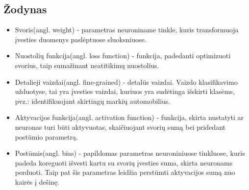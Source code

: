 \documentclass{VUMIFPSkursinis}
\begin{document}
\subsection{Žodynas}
\begin{itemize}
\item{Svoris(angl. weight) - parametras neuroniname tinkle, kuris transformuoja įvesties duomenys paslėptuose sluoksniuose.}
\item{Nuostolių funkcija(angl. loss function) - funkcija, padedanti optimizuoti svorius, taip sumažinant neatitikimų nuostolius.}
\item{Detalieji vaizdai(angl. fine-grained) - detalūs vaizdai. Vaizdo klasifikavimo užduotyse, tai yra įvesties vaizdai, kuriuos yra sudėtinga išskirti klasėms, pvz.: identifikuojant skirtingų markių automobilius.}
\item{Aktyvacijos funkcija(angl. activation function) - funkcija, skirta nustatyti ar neuronas turi būti aktyvuotas, skaičiuojant svorių sumą bei pridedant postūmio parametrą.}
\item{Postūmis(angl. bias) - papildomas parametras neuroniniuose tinkluose, kuris padeda koreguoti išvesti kartu su svorių įvesties suma, skirta neuronams perduoti. Taip pat šis parametras leidžia perstūmti aktyvacijos sumą nuo kairės į dešinę.}
\end{itemize} 
\pagebreak

\printbibliography[heading=bibintoc] 
\thispagestyle{empty}
\end{document}
